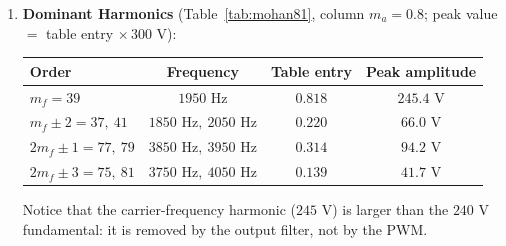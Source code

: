 \documentclass[11pt,a4paper]{article}
\begin{document}
\begin{examplebox}
\begin{enumerate}
  \item \textbf{Dominant Harmonics} (Table~\ref{tab:mohan81}, column $m_a = 0.8$; peak value $= $ table entry $\times\, 300\text{ V}$):
  \begin{center}
  \begin{tabular}{l c c c}
  \toprule
  \textbf{Order} & \textbf{Frequency} & \textbf{Table entry} & \textbf{Peak amplitude} \\
  \midrule
  $m_f = 39$ & $1950\text{ Hz}$ & $0.818$ & $245.4\text{ V}$ \\
  $m_f \pm 2 = 37,\ 41$ & $1850\text{ Hz},\ 2050\text{ Hz}$ & $0.220$ & $66.0\text{ V}$ \\
  $2m_f \pm 1 = 77,\ 79$ & $3850\text{ Hz},\ 3950\text{ Hz}$ & $0.314$ & $94.2\text{ V}$ \\
  $2m_f \pm 3 = 75,\ 81$ & $3750\text{ Hz},\ 4050\text{ Hz}$ & $0.139$ & $41.7\text{ V}$ \\
  \bottomrule
  \end{tabular}
  \end{center}
  Notice that the carrier-frequency harmonic ($245\text{ V}$) is larger than the $240\text{ V}$ fundamental: it is removed by the output filter, not by the PWM.
\end{enumerate}
\end{examplebox}
\end{document}

